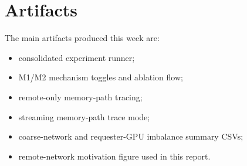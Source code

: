 \documentclass[sigconf,screen,review]{acmart}
\begin{document}
\section{Artifacts}

The main artifacts produced this week are:

\begin{itemize}
  \item consolidated experiment runner;
  \item M1/M2 mechanism toggles and ablation flow;
  \item remote-only memory-path tracing;
  \item streaming memory-path trace mode;
  \item coarse-network and requester-GPU imbalance summary CSVs;
  \item remote-network motivation figure used in this report.
\end{itemize}

\balance
\end{document}
